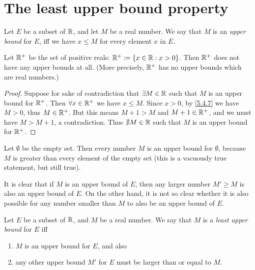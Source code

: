 \section{The least upper bound property}\label{sec:5.5}

\begin{defn}\label{5.5.1}
  Let \(E\) be a subset of \(\mathbb{R}\), and let \(M\) be a real number.
  We say that \(M\) is an \emph{upper bound} for \(E\), iff we have \(x \leq M\) for every element \(x\) in \(E\).
\end{defn}

\setcounter{thm}{2}
\begin{eg}\label{5.5.3}
  Let \(\mathbb{R}^+\) be the set of positive reals: \(\mathbb{R}^+ \coloneqq \left\lbrace x \in \mathbb{R} : x > 0\right\rbrace\).
  Then \(\mathbb{R}^+\) does not have any upper bounds at all.
  (More precisely, \(\mathbb{R}^+\) has no upper bounds which are real numbers.)
\end{eg}

\begin{proof}
  Suppose for sake of contradiction that \(\exists M \in \mathbb{R}\) such that \(M\) is an upper bound for \(\mathbb{R}^+\).
  Then \(\forall x \in \mathbb{R}^+\) we have \(x \leq M\).
  Since \(x > 0\), by \cref{5.4.7} we have \(M > 0\), thus \(M \in \mathbb{R}^+\).
  But this means \(M + 1 > M\) and \(M + 1 \in \mathbb{R}^+\), and we must have \(M > M + 1\), a contradiction.
  Thus \(\nexists M \in \mathbb{R}\) such that \(M\) is an upper bound for \(\mathbb{R}^+\).
\end{proof}

\begin{eg}\label{5.5.4}
  Let \(\emptyset\) be the empty set.
  Then every number \(M\) is an upper bound for \(\emptyset\), because \(M\) is greater than every element of the empty set
  (this is a vacuously true statement, but still true).
\end{eg}

\begin{note}
  It is clear that if \(M\) is an upper bound of \(E\), then any larger number \(M' \geq M\) is also an upper bound of \(E\).
  On the other hand, it is not so clear whether it is also possible for any number smaller than \(M\) to also be an upper bound of \(E\).
\end{note}

\begin{defn}\label{5.5.5}
  Let \(E\) be a subset of \(\mathbb{R}\), and \(M\) be a real number.
  We say that \(M\) is a \emph{least upper bound} for \(E\) iff
  \begin{enumerate}
    \item \(M\) is an upper bound for \(E\), and also
    \item any other upper bound \(M'\) for \(E\) must be larger than or equal to \(M\).
  \end{enumerate}
\end{defn}

